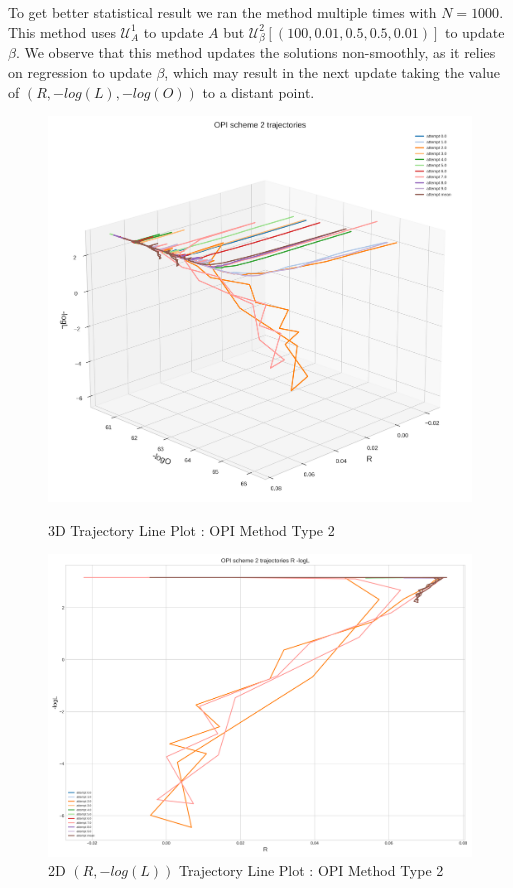 To get better statistical result we ran the method multiple times with $N=1000$. This method uses $\mathcal{U}^{1}_{A}$ to update $A$ but $\mathcal{U}^{2}_{\beta}[(100,0.01,0.5,0.5,0.01)]$ to update $\beta$. We observe that this method updates the solutions non-smoothly, as it relies on regression to update $\beta$, which may result in the next update taking the value of $(R,-log(L),-log(O))$ to a distant point.
\begin{figure}[H]
    \centering
    \begin{minipage}[t]{0.45\textwidth}
        \centering
        \includegraphics[width=\textwidth]{images/1-OPI scheme 2 mean trajectory.png}
        \captionsetup{font=tiny}
        \caption{3D Trajectory Line Plot : OPI Method Type 2}
        \label{fig:cumulative_returns}
    \end{minipage}%
    \begin{minipage}[t]{0.5511\textwidth}
        \centering
        \includegraphics[width=\textwidth]{images/OPI scheme 2 trajectories R -logL.png}
        \captionsetup{font=tiny}
        \caption{2D $(R,-log(L))$ Trajectory Line Plot : OPI Method Type 2}
        \label{fig:corr_matrix_ts_qrt_data}
    \end{minipage}
\end{figure}
